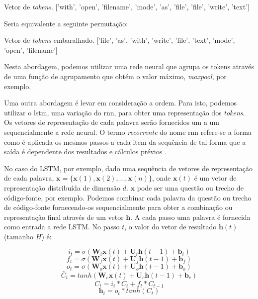 \begin{mypythonembedding}{Vetor de \textit{tokens}.}
  ['with', 'open', 'filename', 'mode', 'as', 'file', 'file', 'write', 'text']
\end{mypythonembedding}

Seria equivalente a seguinte permutação:

\begin{mypythonembedding}{Vetor de \textit{tokens} embaralhado.}
['file', 'as', 'with', 'write', 'file', 'text', 'mode', 'open', 'filename']
\end{mypythonembedding}

Nesta abordagem, podemos utilizar uma rede neural que agrupa os tokens através de uma função de agrupamento que obtém o valor máximo, \textit{maxpool}, por exemplo.

Uma outra abordagem é levar em consideração a ordem. Para isto, podemos utilizar o \acrfull{lstm}, uma variação do \acrfull{rnn}, para obter uma representação dos \textit{tokens}. Os vetores de representação de cada palavra serão fornecidos um a um sequencialmente a rede neural. O termo \emph{recorrente} do nome \acrfull{rnn} refere-se a forma como é aplicada os mesmos passos a cada item da sequência de tal forma que a saída é dependente dos resultados e cálculos prévios \citep{tom-young:trends-deep-learning-nlp}.



No caso do LSTM, por exemplo, dado uma sequência de vetores de representação de cada palavra, $\bm{x} = \{ \bm{x}(1), \bm{x}(2), . . ., \bm{x}(n) \}$, onde $\bm{x}(t)$ é um vetor de representação distribuída de dimensão $d$. $\bm{x}$ pode ser uma questão ou trecho de código-fonte, por exemplo. Podemos combinar cada palavra da questão ou trecho de código-fonte fornecendo-os sequencialmente para obter a combinação ou representação final através de um vetor $\bm{h}$. A cada passo uma palavra é fornecida como entrada a rede LSTM. No passo $t$, o valor do vetor de resultado $\bm{h}(t)$ (tamanho $H$) é:

\begin{equation}
    i_{t} = \sigma(\bm{W}_{i}\bm{x}(t) + \bm{U}_{i}\bm{h}(t - 1) + \bm{b}_{i})
\end{equation}
\begin{equation}
    f_{t} = \sigma(\bm{W}_{f}\bm{x}(t) + \bm{U}_{f}\bm{h}(t - 1) + \bm{b}_{f})
\end{equation}
\begin{equation}
    o_{t} = \sigma(\bm{W}_{o}\bm{x}(t) + \bm{U}_{o}\bm{h}(t - 1) + \bm{b}_{o})
\end{equation}
\begin{equation}
    \bar{C}_{t} = tanh(\bm{W}_{c}\bm{x}(t) + \bm{U}_{c}\bm{h}(t - 1) + \bm{b}_{c})
\end{equation}
\begin{equation}
    C_{t} = i_{t} * \bar{C}_t + f_{t} * C_{t - 1}
\end{equation}
\begin{equation}
    \bm{h}_{t} = o_{t} * tanh(C_{t})
\end{equation}

